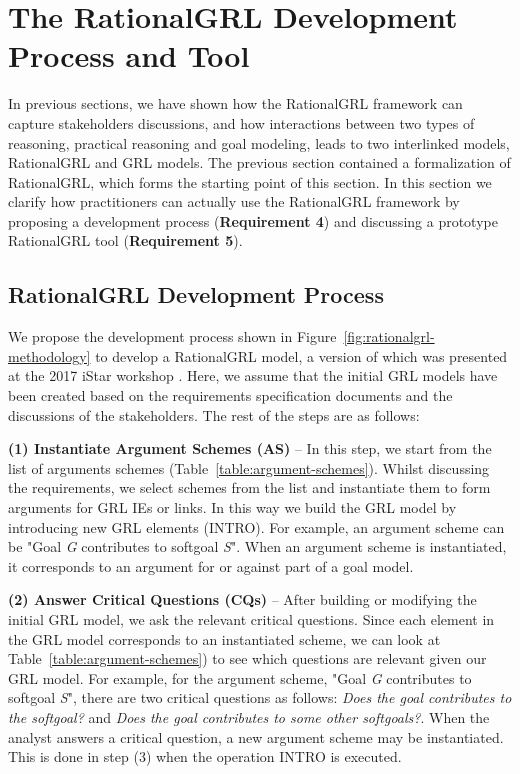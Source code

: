 \section{The RationalGRL Development Process and Tool}
\label{sect:methodology+tool}

In previous sections, we have shown how the RationalGRL framework can capture stakeholders discussions, and how interactions between two types of reasoning, practical reasoning and goal modeling, leads to two interlinked models, RationalGRL and GRL models. The previous section contained a formalization of RationalGRL, which forms the starting point of this section. In this section we clarify how practitioners can actually use the RationalGRL framework by proposing a development process (\textbf{Requirement 4}) and discussing a prototype RationalGRL tool (\textbf{Requirement 5}).

\subsection{RationalGRL Development Process}
\label{sect:methodology} 

We propose the development process shown in Figure~\ref{fig:rationalgrl-methodology} to develop a RationalGRL model, a version of which was presented at the 2017 iStar workshop \cite{ghanavatiMethodology}. Here, we assume that the initial GRL models have been created based on the requirements specification documents and the discussions of the stakeholders. The rest of the steps are as follows:

\textbf{(1) Instantiate Argument Schemes (AS)} -- In this step, we start from the list of arguments schemes (Table~\ref{table:argument-schemes}). Whilst discussing the requirements, we select schemes from the list and instantiate them to form arguments for GRL IEs or links. In this way we build the GRL model by introducing new GRL elements (\textsf{INTRO}). For example, an argument scheme can be "Goal \emph{G} contributes to softgoal \emph{S}". When an argument scheme is instantiated, it corresponds to an argument for or against part of a goal model.

\textbf{(2) Answer Critical Questions (CQs)} -- After building or modifying the initial GRL model, we ask the relevant critical questions. Since each element in the GRL model corresponds to an instantiated scheme, we can look at Table~\ref{table:argument-schemes}) to see which questions are relevant given our GRL model. For example, for the argument scheme, "Goal \emph{G} contributes to softgoal \emph{S}", there are two critical questions as follows:  \emph{Does the goal contributes to the softgoal?} and \emph{Does the goal contributes to some other softgoals?}. When the analyst answers  a critical question, a new argument scheme may be instantiated. This is done in step (3) when the operation INTRO is executed.

